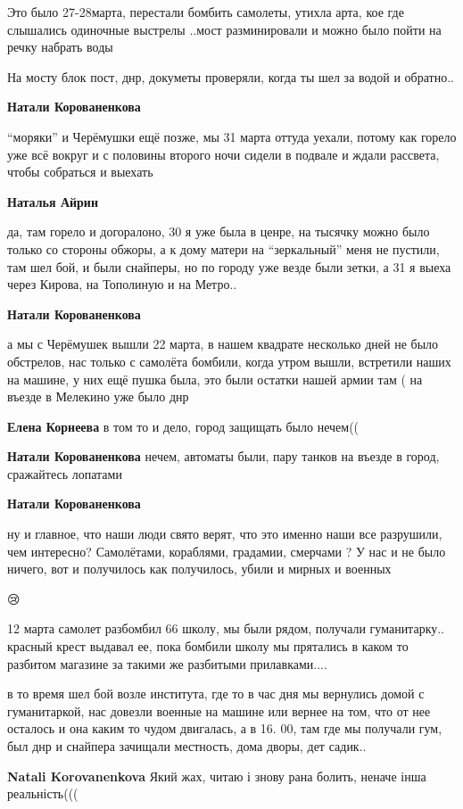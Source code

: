 Это было 27-28марта, перестали бомбить самолеты, утихла арта, кое где слышались
одиночные выстрелы ..мост разминировали и можно было пойти на речку набрать
воды

На мосту блок пост, днр, докуметы проверяли, когда ты шел за водой и обратно..

\textbf{Натали Корованенкова} 

\enquote{моряки} и Черёмушки ещё позже, мы 31 марта оттуда уехали, потому как горело уже
всё вокруг и с половины второго ночи сидели в подвале и ждали рассвета, чтобы
собраться и выехать

\begin{itemize} %
\textbf{Наталья Айрин} 

да, там горело и догоралоно, 30 я уже была в ценре, на тысячку можно было только
со стороны обжоры, а к дому матери на \enquote{зеркальный} меня не пустили, там шел бой,
и были снайперы, но по городу уже везде были зетки, а 31 я выеха через Кирова, на
Тополиную и на Метро..

\textbf{Натали Корованенкова} 

а мы с Черёмушек вышли 22 марта, в нашем квадрате несколько дней не было
обстрелов, нас только с самолёта бомбили, когда утром вышли, встретили наших на
машине, у них ещё пушка была, это были остатки нашей армии там ( на въезде в
Мелекино уже было днр

\textbf{Елена Корнеева} в том то и дело, город защищать было нечем((

\textbf{Натали Корованенкова} нечем, автоматы были, пару танков на въезде в город, сражайтесь лопатами

\textbf{Натали Корованенкова} 

ну и главное, что наши люди свято верят, что это именно наши все разрушили, чем
интересно? Самолётами, кораблями, градамии, смерчами ? У нас и не было
ничего, вот и получилось как получилось, убили и мирных и военных

\end{itemize} %


😢


12 марта самолет разбомбил 66 школу, мы были рядом, получали
гуманитарку.. красный крест выдавал ее, пока бомбили школу мы прятались в каком
то разбитом магазине за такими же разбитыми прилавками....

в то время шел бой возле института, где то в час дня мы вернулись домой с
гуманитаркой, нас довезли военные на машине или вернее на том, что от нее
осталось и она каким то чудом двигалась, а в 16. 00, там где мы получали гум, был
днр и снайпера зачищали местность, дома дворы, дет садик..

\begin{itemize} %
\textbf{Natali Korovanenkova} Який жах, читаю і знову рана болить, неначе інша реальність(((
\end{itemize} %
